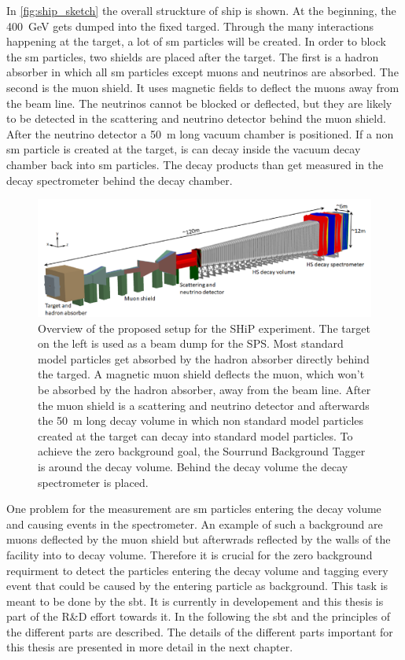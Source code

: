 In \autoref{fig:ship_sketch} the overall struckture of \ac{ship} is shown.
At the beginning, the \SI{400}{\giga\electronvolt} gets dumped into the fixed targed.
Through the many interactions happening at the target, a lot of \ac{sm} particles will be created.
In order to block the \ac{sm} particles, two shields are placed after the target.
The first is a hadron absorber in which all \ac{sm} particles except muons and neutrinos are absorbed.
The second is the muon shield. 
It uses magnetic fields to deflect the muons away from the beam line.
The neutrinos cannot be blocked or deflected, but they are likely to be detected in the scattering and neutrino detector behind the muon shield.
After the neutrino detector a \SI{50}{\meter} long vacuum chamber is positioned.
If a non \ac{sm} particle is created at the target, is can decay inside the vacuum decay chamber back into \ac{sm} particles.
The decay products than get measured in the decay spectrometer behind the decay chamber.
\begin{figure}
	\centering
	\includegraphics[width=1.\textwidth]{pictures/ship_sketch}
	\caption[Overview of the SHiP experiment.]{Overview of the proposed setup for the SHiP experiment. The target on the left is used as a beam dump for the SPS. Most standard model particles get absorbed by the hadron absorber directly behind the targed. A magnetic muon shield deflects the muon, which won't be absorbed by the hadron absorber, away from the beam line. After the muon shield is a scattering and neutrino detector and afterwards the \SI{50}{\meter} long decay volume in which non standard model particles created at the target can decay into standard model particles. To achieve the zero background goal, the Sourrund Background Tagger is around the decay volume. Behind the decay volume the decay spectrometer is placed. \cite{ship_coll}}
	\label{fig:ship_sketch}
\end{figure}

One problem for the measurement are \ac{sm} particles entering the decay volume and causing events in the spectrometer.
An example of such a background are muons deflected by the muon shield but afterwrads reflected by the walls of the facility into to decay volume.
Therefore it is crucial for the zero background requirment to detect the particles entering the decay volume and tagging every event that could be caused by the entering particle as background.
This task is meant to be done by the \ac{sbt}.
It is currently in developement and this thesis is part of the R\&D effort towards it.
In the following the \ac{sbt} and the principles of the different parts are described.
The details of the different parts important for this thesis are presented in more detail in the next chapter.

